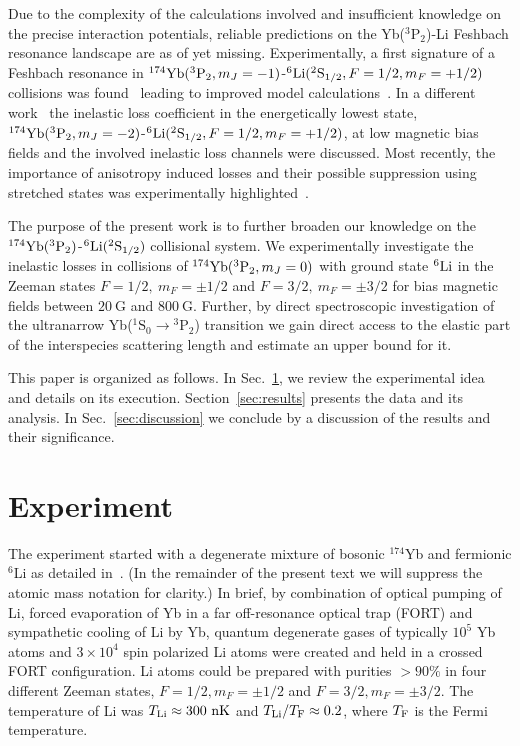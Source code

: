 \documentclass[twocolumn,superscriptaddress,showpacs,floatfix,amsmath,amssymb]{revtex4-1}
\newcommand{\singlet}{{}^1\mathrm{S}_0}
\newcommand{\triplet}{{}^3\mathrm{P}_2}
\newcommand{\Li}{{}^2\mathrm{S}_{1/2}}
\newcommand{\G}{\mathrm{G}}
\begin{document}
Due to the complexity of the calculations involved and insufficient knowledge
on the precise interaction potentials, reliable predictions on the
Yb($\triplet$)-Li Feshbach resonance landscape are as of yet missing.
Experimentally, a first signature of a Feshbach resonance in $^{174}{\rm
Yb}(\triplet, m_J = -1)$-$^6{\rm Li}(\Li, F=1/2, m_F=+1/2)$ collisions was
found~\cite{dowd_magnetic_2015} leading to improved model
calculations~\cite{petrov_magnetic_2015}. In a different
work~\cite{konishi_collisional_2016} the inelastic loss coefficient in the
energetically lowest state, $^{174}{\rm Yb}(\triplet, m_J = -2)$-$^6{\rm
Li}(\Li, F=1/2, m_F=+1/2)$, at low magnetic bias fields and the involved
inelastic loss channels were discussed. Most recently, the importance of
anisotropy induced losses and their possible suppression using stretched
states was experimentally highlighted~\cite{schafer_spin_2017}.

The purpose of the present work is to further broaden our knowledge on the
$^{174}{\rm Yb}(\triplet)$-$^6{\rm Li}(\Li)$ collisional system. We
experimentally investigate the inelastic losses in collisions of $^{174}{\rm
Yb}(\triplet, m_J = 0)$ with ground state $^6{\rm Li}$ in the Zeeman states
$F=1/2,\ m_F = \pm 1/2$ and $F=3/2,\ m_F = \pm 3/2$ for bias magnetic fields
between $20~\G$ and $800~\G$. Further, by direct spectroscopic investigation
of the ultranarrow Yb($\singlet \rightarrow \triplet$) transition we gain
direct access to the elastic part of the interspecies scattering length and
estimate an upper bound for it.

This paper is organized as follows. In Sec.~\ref{sec:expt}, we review the
experimental idea and details on its execution. Section~\ref{sec:results}
presents the data and its analysis. In Sec.~\ref{sec:discussion} we conclude
by a discussion of the results and their significance.

\section{Experiment}
\label{sec:expt}

The experiment started with a degenerate mixture of bosonic $^{174}$Yb and
fermionic $^6$Li as detailed in~\cite{hara_quantum_2011, schafer_spin_2017}.
(In the remainder of the present text we will suppress the atomic mass
notation for clarity.) In brief, by combination of optical pumping of Li,
forced evaporation of Yb in a far off-resonance optical trap (FORT) and
sympathetic cooling of Li by Yb, quantum degenerate gases of typically $10^5$
Yb atoms and $3\times10^4$ spin polarized Li atoms were created and held in a
crossed FORT configuration. Li atoms could be prepared with purities $> 90\%$
in four different Zeeman states, $F=1/2, m_F = \pm 1/2$ and $F=3/2, m_F = \pm
3/2$. The temperature of Li was $T_{\rm Li} \approx 300~{\rm nK}$ and
$T_{\rm Li}/T_{\rm F} \approx 0.2$, where $T_{\rm F}$ is the Fermi
temperature.
\end{document}

